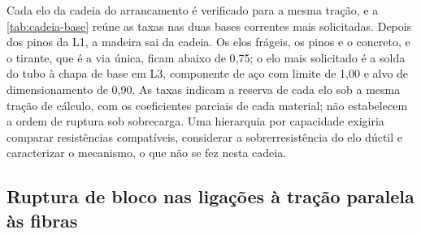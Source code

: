 Cada elo da cadeia do arrancamento é verificado para a mesma tração, e a
\autoref{tab:cadeia-base} reúne as taxas nas duas bases correntes mais
solicitadas. Depois dos pinos da L1, a madeira sai da cadeia. Os elos frágeis, os
pinos e o concreto, e o tirante, que é a via única, ficam abaixo de 0,75; o elo
mais solicitado é a solda do tubo à chapa de base em L3, componente de aço com
limite de 1,00 e alvo de dimensionamento de 0,90. As taxas indicam a reserva de
cada elo sob a mesma tração de cálculo, com os coeficientes parciais de cada
material; não estabelecem a ordem de ruptura sob sobrecarga. Uma hierarquia por
capacidade exigiria comparar resistências compatíveis, considerar a
sobrerresistência do elo dúctil e caracterizar o mecanismo, o que não se fez
nesta cadeia.


\subsection{Ruptura de bloco nas ligações à tração paralela às fibras}\label{ssec:bloco-pilares}

